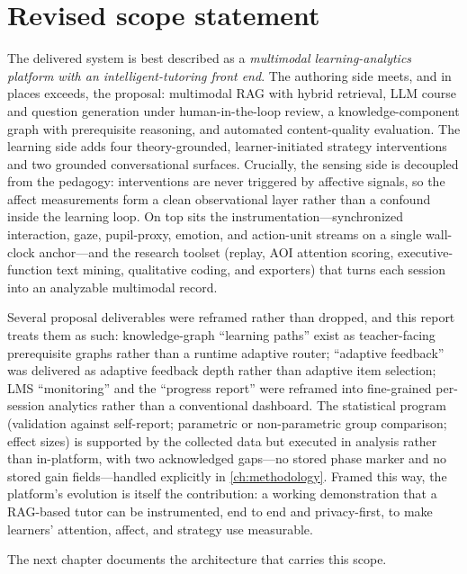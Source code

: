 \section{Revised scope statement}
\label{sec:scope-statement}

The delivered system is best described as a \emph{multimodal
learning-analytics platform with an intelligent-tutoring front end}. The
authoring side meets, and in places exceeds, the proposal: multimodal RAG
with hybrid retrieval, LLM course and question generation under
human-in-the-loop review, a knowledge-component graph with prerequisite
reasoning, and automated content-quality evaluation. The learning side
adds four theory-grounded, learner-initiated strategy interventions and
two grounded conversational surfaces. Crucially, the sensing side is
decoupled from the pedagogy: interventions are never triggered by
affective signals, so the affect measurements form a clean observational
layer rather than a confound inside the learning loop. On top sits the
instrumentation---synchronized interaction, gaze, pupil-proxy, emotion,
and action-unit streams on a single wall-clock anchor---and the research
toolset (replay, AOI attention scoring, executive-function text mining,
qualitative coding, and exporters) that turns each session into an
analyzable multimodal record.

Several proposal deliverables were reframed rather than dropped, and this
report treats them as such: knowledge-graph ``learning paths'' exist as
teacher-facing prerequisite graphs rather than a runtime adaptive router;
``adaptive feedback'' was delivered as adaptive feedback depth rather
than adaptive item selection; LMS ``monitoring'' and the ``progress
report'' were reframed into fine-grained per-session analytics rather
than a conventional dashboard. The statistical program (validation
against self-report; parametric or non-parametric group comparison;
effect sizes) is supported by the collected data but executed in
analysis rather than in-platform, with two acknowledged gaps---no stored
phase marker and no stored gain fields---handled explicitly in
\cref{ch:methodology}. Framed this way, the platform's evolution is
itself the contribution: a working demonstration that a RAG-based tutor
can be instrumented, end to end and privacy-first, to make learners'
attention, affect, and strategy use measurable.

\medskip
\noindent The next chapter documents the architecture that carries this
scope.
